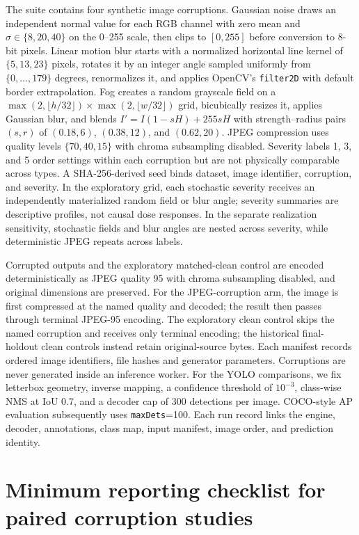 \documentclass[10pt]{article}
\begin{document}
The suite contains four synthetic image corruptions. Gaussian noise draws an independent normal value for each RGB channel with zero mean and $\sigma\in\{8,20,40\}$ on the 0--255 scale, then clips to $[0,255]$ before conversion to 8-bit pixels. Linear motion blur starts with a normalized horizontal line kernel of $\{5,13,23\}$ pixels, rotates it by an integer angle sampled uniformly from $\{0,\ldots,179\}$ degrees, renormalizes it, and applies OpenCV's \texttt{filter2D} with default border extrapolation. Fog creates a random grayscale field on a $\max(2,\lfloor h/32\rfloor)\times\max(2,\lfloor w/32\rfloor)$ grid, bicubically resizes it, applies Gaussian blur, and blends $I'=I(1-sH)+255sH$ with strength--radius pairs $(s,r)$ of $(0.18,6)$, $(0.38,12)$, and $(0.62,20)$. JPEG compression uses quality levels $\{70,40,15\}$ with chroma subsampling disabled. Severity labels 1, 3, and 5 order settings within each corruption but are not physically comparable across types. A SHA-256-derived seed binds dataset, image identifier, corruption, and severity. In the exploratory grid, each stochastic severity receives an independently materialized random field or blur angle; severity summaries are descriptive profiles, not causal dose responses. In the separate realization sensitivity, stochastic fields and blur angles are nested across severity, while deterministic JPEG repeats across labels.

Corrupted outputs and the exploratory matched-clean control are encoded deterministically as JPEG quality 95 with chroma subsampling disabled, and original dimensions are preserved. For the JPEG-corruption arm, the image is first compressed at the named quality and decoded; the result then passes through terminal JPEG-95 encoding. The exploratory clean control skips the named corruption and receives only terminal encoding; the historical final-holdout clean controls instead retain original-source bytes. Each manifest records ordered image identifiers, file hashes and generator parameters. Corruptions are never generated inside an inference worker. For the YOLO comparisons, we fix letterbox geometry, inverse mapping, a confidence threshold of $10^{-3}$, class-wise NMS at IoU 0.7, and a decoder cap of 300 detections per image. COCO-style AP evaluation subsequently uses \texttt{maxDets}=100. Each run record links the engine, decoder, annotations, class map, input manifest, image order, and prediction identity.


\FloatBarrier

\section{Minimum reporting checklist for paired corruption studies}
\end{document}

